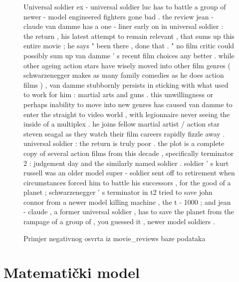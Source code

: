 \begin{figure}
\begin{bclogo}
{Universal soldier} \footnotesize{ ex - universal soldier luc has to battle a group of newer - model engineered fighters gone bad . the review jean - claude van damme has a one - liner early on in universal soldier : the return , his latest attempt to remain relevant , that sums up this entire movie ; he says " been there , done that . " no film critic could possibly sum up van damme ' s recent film choices any better . while other ageing action stars have wisely moved into other film genres ( schwarzenegger makes as many family comedies as he does action films ) , van damme stubbornly persists in sticking with what used to work for him : martial arts and guns . this unwillingness or perhaps inability to move into new genres has caused van damme to enter the straight to video world , with legionnaire never seeing the inside of a multiplex . he joins fellow martial artist / action star steven seagal as they watch their film careers rapidly fizzle away . universal soldier : the return is truly poor . the plot is a complete copy of several action films from this decade , specifically terminator 2 : judgement day and the similarly named soldier . soldier ' s kurt russell was an older model super - soldier sent off to retirement when circumstances forced him to battle his successors , for the good of a planet ; schwarzenegger ' s terminator in t2 tried to save john connor from a newer model killing machine , the t - 1000 ; and jean - claude , a former universal soldier , has to save the planet from the rampage of a group of , you guessed it , newer model soldiers .}
\end{bclogo}
\caption{Primjer negativnog osvrta iz movie\_reviews baze podataka}
\label{fig:critic_example}
\end{figure}

\section{Matematički model}

